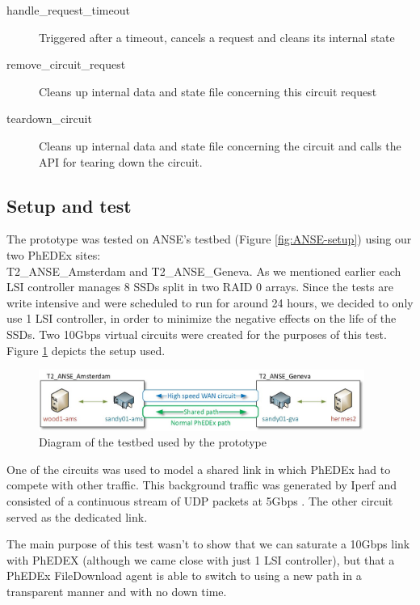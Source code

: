 \begin{description}
	\item[handle\_request\_timeout]
		Triggered after a timeout, cancels a request and cleans its internal state
	\item[remove\_circuit\_request]
		Cleans up internal data and state file concerning this circuit request
	\item[teardown\_circuit]
		Cleans up internal data and state file concerning the circuit and calls the API for 
		tearing down the circuit.
\end{description}

\subsection{Setup and test}

The prototype was tested on ANSE's testbed (Figure \ref{fig:ANSE-setup}) using 
our two PhEDEx sites: \\ T2\_ANSE\_Amsterdam and T2\_ANSE\_Geneva. As we mentioned earlier
each LSI controller manages 8 SSDs split in two RAID 0 arrays. Since the tests are write 
 intensive and were scheduled to run for around 24 hours, we decided to only use 
 1 LSI controller, in order to minimize the negative effects on the life of the SSDs.
Two 10Gbps virtual circuits were created for the purposes of this test. Figure \ref{fig:testbed}
depicts the setup used.

\begin{figure}[h]
  \centering
  \includegraphics[width=0.95\textwidth]{Figures/FileDownload_ANSE_Testbed}
  \caption{Diagram of the testbed used by the prototype}
  \label{fig:testbed}
\end{figure} 

One of the circuits was used to model a shared link in which PhEDEx had to compete 
with other traffic. This background traffic was generated by Iperf and consisted of a 
continuous stream of UDP packets at 5Gbps . The other circuit served as the dedicated
link.

The main purpose of this test wasn't to show that we can saturate a 10Gbps link with
PhEDEX (although we came close with just 1 LSI controller), but that a PhEDEx FileDownload agent 
is able to switch to using a new path in a transparent manner and with no down time.


